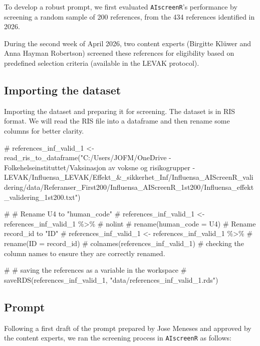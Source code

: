 \documentclass[
  letterpaper,
  DIV=11,
  numbers=noendperiod]{scrartcl}
\newenvironment{Shaded}{\begin{snugshade}}{\end{snugshade}}
\newcommand{\CommentTok}[1]{\textcolor[rgb]{0.37,0.37,0.37}{#1}}
\begin{document}
To develop a robust prompt, we first evaluated \texttt{AIscreenR}'s
performance by screening a random sample of 200 references, from the 434
references identified in 2026.

During the second week of April 2026, two content experts (Birgitte
Klüwer and Anna Hayman Robertson) screened these references for
eligibility based on predefined selection criteria (available in the
LEVAK protocol).

\subsection{Importing the dataset}\label{importing-the-dataset}

Importing the dataset and preparing it for screening. The dataset is in
RIS format. We will read the RIS file into a dataframe and then rename
some columns for better clarity.

\begin{Shaded}
\begin{Highlighting}[]
\CommentTok{\# references\_inf\_valid\_1 \textless{}{-} read\_ris\_to\_dataframe("C:/Users/JOFM/OneDrive {-} Folkehelseinstituttet/Vaksinasjon av voksne og risikogrupper {-} LEVAK/Influensa\_LEVAK/Effekt\_\&\_sikkerhet\_Inf/Influensa\_AIScreenR\_validering/data/Referanser\_First200/Influensa\_AIScreenR\_1st200/Influensa\_effekt\_validering\_1st200.txt")}

\CommentTok{\# \# Rename U4 to "human\_code"}
\CommentTok{\# references\_inf\_valid\_1 \textless{}{-} references\_inf\_valid\_1 \%\textgreater{}\% \# nolint}
\CommentTok{\#   rename(human\_code = U4)}
\CommentTok{\#   Rename record\_id to "ID"}
\CommentTok{\# references\_inf\_valid\_1 \textless{}{-} references\_inf\_valid\_1 \%\textgreater{}\%}
\CommentTok{\#   rename(ID = record\_id)}
\CommentTok{\#   colnames(references\_inf\_valid\_1) \# checking the column names to ensure they are correctly renamed.}

\CommentTok{\# \# saving the references as a variable in the workspace}
\CommentTok{\# saveRDS(references\_inf\_valid\_1, "data/references\_inf\_valid\_1.rds")}
\end{Highlighting}
\end{Shaded}

\subsection{Prompt}\label{prompt}

Following a first draft of the prompt prepared by Jose Meneses and
approved by the content experts, we ran the screening process in
\texttt{AIscreenR} as follows:
\end{document}

